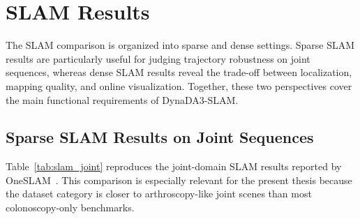 \section{SLAM Results}
The SLAM comparison is organized into sparse and dense settings. Sparse SLAM results are particularly useful for judging trajectory robustness on joint sequences, whereas dense SLAM results reveal the trade-off between localization, mapping quality, and online visualization. Together, these two perspectives cover the main functional requirements of DynaDA3-SLAM.

\subsection{Sparse SLAM Results on Joint Sequences}
Table~\ref{tab:slam_joint} reproduces the joint-domain SLAM results reported by OneSLAM~\cite{oneslam2024}. This comparison is especially relevant for the present thesis because the dataset category is closer to arthroscopy-like joint scenes than most colonoscopy-only benchmarks.

\begin{table}[htbp]
    \centering
    \caption[Joint-sequence SLAM results]{Comparison of sparse SLAM results on joint sequences, reproduced from OneSLAM~\cite{oneslam2024}.}
    \label{tab:slam_joint}
\end{table}

